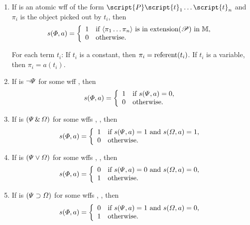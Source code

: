\begin{enumerate}
\item If \metaA{} is an atomic wff of the form $\script{P}\script{t}_1\ldots\script{t}_n$ and $\pi_i$ is the object picked out by $t_i$, then
\begin{displaymath}s(\varPhi{}, a) =
	\left\{\begin{array}{ll}
	1 & \mbox{if ${\langle}\pi_1\ldots\pi_n{\rangle}$ is in \ensuremath{\mbox{extension}(\mathscr{P})} in \ensuremath{\mathbb{M}}},\\
	0 & \mbox{otherwise.}
	\end{array}\right.
\end{displaymath}

For each term $t_i$: If $t_i$ is a constant, then $\pi_i = \mbox{referent}(t_i)$. If $t_i$ is a variable, then $\pi_i = a(t_i)$.

\item If \metaA{} is ${\neg}\varPsi{}$ for some wff \metaB{}, then
\begin{displaymath}s(\varPhi{}, a) =
	\left\{\begin{array}{ll}
	1 & \mbox{if $s(\varPsi{}, a) = 0$},\\
	0 & \mbox{otherwise.}
	\end{array}\right.
\end{displaymath}

\item If \metaA{} is $(\varPsi{}\,\&\,\varOmega{})$ for some wffs \metaB{}, \metaC{}, then
\begin{displaymath}s(\varPhi{}, a) =
	\left\{\begin{array}{ll}
	1 & \mbox{if $s(\varPsi{}, a) = 1$ and $s(\varOmega{}, a) = 1$,}\\
	0 & \mbox{otherwise.}
	\end{array}\right.
\end{displaymath}

\item If \metaA{} is $(\varPsi{}\vee\varOmega{})$ for some wffs \metaB{}, \metaC{}, then
\begin{displaymath}s(\varPhi{}, a) =
	\left\{\begin{array}{ll}
	0 & \mbox{if $s(\varPsi{}, a) = 0$  and $s(\varOmega{}, a) = 0$,}\\
	1 & \mbox{otherwise.}
	\end{array}\right.
\end{displaymath}

\item If \metaA{} is $(\varPsi{}\supset\varOmega{})$ for some wffs \metaB{}, \metaC{}, then
\begin{displaymath}s(\varPhi{}, a) =
	\left\{\begin{array}{ll}
	0 & \mbox{if $s(\varPsi{}, a) = 1$ and $s(\varOmega{}, a) = 0$,}\\
	1 & \mbox{otherwise.}
	\end{array}\right.
\end{displaymath}


\end{enumerate}
